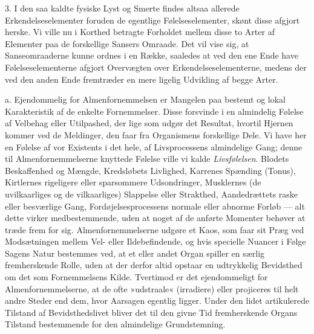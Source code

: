 \documentclass[12pt,a4paper,openany]{book}
\newcommand{\opage}[1]{\marginnote{\footnotesize\textit{[#1]}}}
\begin{document}
3. I den saa kaldte fysiske Lyst og Smerte findes altsaa allerede
Erkendelseselementer foruden de egentlige Følelseselementer, skønt disse
afgjort herske. Vi ville nu i Korthed betragte Forholdet mellem disse to
Arter af Elementer paa de forskellige Sansers Omraade. Det vil vise sig,
at Sanseomraaderne kunne ordnes i en Række, saaledes at ved den ene Ende
have Følelseselementerne afgjort Overvægten over
\opage{273}Erkendelseselementerne, medens der ved den anden Ende
fremtræder en mere ligelig Udvikling af begge Arter.

a. Ejendommelig for Almenfornemmelsen er Mangelen paa bestemt og lokal
Karakteristik af de enkelte Fornemmelser. Disse forsvinde i en
almindelig Følelse af Velbehag eller Utilpashed, der lige som udgør det
Resultat, hvortil Hjernen kommer ved de Meldinger, den faar fra
Organismens forskellige Dele. Vi have her en Følelse af vor Existents i
det hele, af Livsprocessens almindelige Gang; denne til
Almenfornemmelserne knyttede Følelse ville vi kalde \emph{Livsfølelsen}.
Blodets Beskaffenhed og Mængde, Kredsløbets Livlighed, Karrenes Spænding
(Tonus), Kirtlernes rigeligere eller sparsommere Udsondringer,
Musklernes (de uvilkaarliges og de vilkaarliges) Slappelse eller
Strakthed, Aandedrættets raske eller besværlige Gang,
Fordøjelsesprocessens normale eller abnorme Forløb --- alt dette virker
medbestemmende, uden at noget af de anførte Momenter behøver at træde
frem for sig. Almenfornemmelserne udgøre et Kaos, som faar sit Præg ved
Modsætningen mellem Vel- eller Ildebefindende, og hvis specielle Nuancer
i Følge Sagens Natur bestemmes ved, at et eller andet Organ spiller en
særlig fremherskende Rolle, uden at der derfor altid opstaar en
udtrykkelig Bevidsthed om det som Fornemmelsens Kilde. Tvertimod er det
ejendommeligt for Almenfornemmelserne, at de ofte »udstraale«
(irradiere) eller projiceres til helt andre Steder end dem, hvor
Aarsagen egentlig ligger. Under den lidet artikulerede Tilstand af
Bevidsthedslivet bliver det til den givne Tid fremherskende Organs
Tilstand bestemmende for den almindelige Grundstemning.
\end{document}
